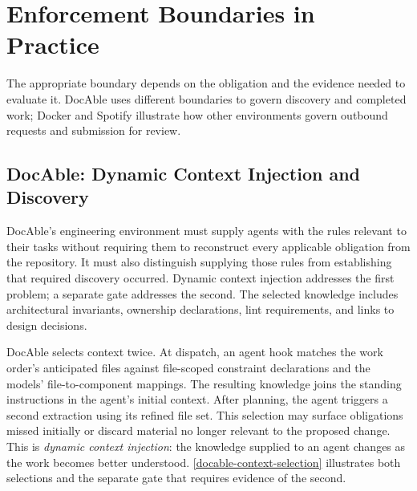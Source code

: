 \section{Enforcement Boundaries in Practice}\label{heading:enforcement-boundaries-in-practice}

The appropriate boundary depends on the obligation and the evidence needed to evaluate it. DocAble uses different boundaries to govern discovery and completed work; Docker and Spotify illustrate how other environments govern outbound requests and submission for review.


\subsection{DocAble: Dynamic Context Injection and Discovery}\label{heading:docable-dynamic-context-injection-and-discovery}

DocAble's engineering environment must supply agents with the rules relevant to their tasks without requiring them to reconstruct every applicable obligation from the repository. It must also distinguish supplying those rules from establishing that required discovery occurred. Dynamic context injection addresses the first problem; a separate gate addresses the second. The selected knowledge includes architectural invariants, ownership declarations, lint requirements, and links to design decisions.

DocAble selects context twice. At dispatch, an agent hook matches the work order's anticipated files against file-scoped constraint declarations and the models' file-to-component mappings. The resulting knowledge joins the standing instructions in the agent's initial context. After planning, the agent triggers a second extraction using its refined file set. This selection may surface obligations missed initially or discard material no longer relevant to the proposed change. This is \emph{dynamic context injection}: the knowledge supplied to an agent changes as the work becomes better understood. \autoref{docable-context-selection} illustrates both selections and the separate gate that requires evidence of the second.

